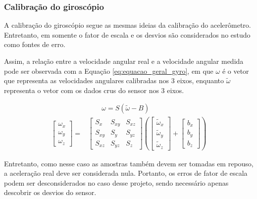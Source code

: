 \documentclass[acronym, symbols, table]{fei}
\begin{document}
		\subsubsection{Calibração do giroscópio}\label{sec:calibracao_giroscopio}
		
		A calibração do giroscópio segue as mesmas ideias da calibração do acelerômetro. Entretanto, em \textcite{hassan2020field} somente o fator de escala e os desvios são considerados no estudo como fontes de erro.
		
		Assim, a relação entre a velocidade angular real e a velocidade angular medida pode ser observada com a Equação \eqref{eq:equacao_geral_gyro}, em que $\omega$ é o vetor que representa as velocidades angulares calibradas nos 3 eixos, enquanto $\tilde{\omega}$ representa o vetor com os dados crus do sensor nos 3 eixos.
		
		\begin{equation}\label{eq:equacao_geral_gyro}
			\begin{split}
				&\quad \quad \omega = S(\tilde{\omega} - B) \\
				\begin{bmatrix}
					\omega_x \\ \omega_y \\ \omega_z
				\end{bmatrix} = 
				&\begin{bmatrix}
					S_x & S_{xy} & S_{xz} \\ S_{xy} & S_y & S_{yz} \\ S_{xz} & S_{yz} & S_z
				\end{bmatrix} \left(
				\begin{bmatrix}
					\tilde{\omega}_x \\ \tilde{\omega}_y \\ \tilde{\omega}_z
				\end{bmatrix} + 
				\begin{bmatrix}
					b_x \\ b_y \\ b_z
				\end{bmatrix}\right)
			\end{split}
		\end{equation}
		
		Entretanto, como nesse caso as amostras também devem ser tomadas em repouso, a aceleração real deve ser considerada nula. Portanto, os erros de fator de escala podem ser desconsiderados no caso desse projeto, sendo necessário apenas descobrir os desvios do sensor.
				
\end{document}
